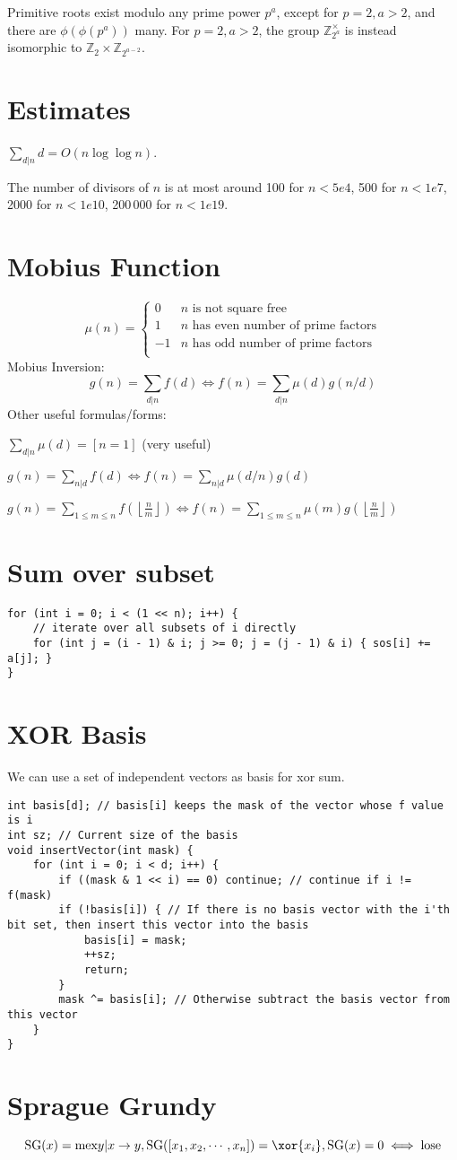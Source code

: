 	Primitive roots exist modulo any prime power $p^a$, except for $p = 2, a > 2$, and there are $\phi(\phi(p^a))$ many.
	For $p = 2, a > 2$, the group $\mathbb Z_{2^a}^\times$ is instead isomorphic to $\mathbb Z_2 \times \mathbb Z_{2^{a-2}}$.

\section{Estimates}
	$\sum_{d|n} d = O(n \log \log n)$.

	The number of divisors of $n$ is at most around 100 for $n < 5e4$, 500 for $n < 1e7$, 2000 for $n < 1e10$, 200\,000 for $n < 1e19$.

	\section{Mobius Function}
	\[
		\mu(n) = \begin{cases} 0 & n \textrm{ is not square free}\\ 1 & n \textrm{ has even number of prime factors}\\ -1 & n \textrm{ has odd number of prime factors}\\\end{cases}
	\]
	  Mobius Inversion:
	  \[ g(n) = \sum_{d|n} f(d) \Leftrightarrow f(n) = \sum_{d|n} \mu(d)g(n/d) \]
	  Other useful formulas/forms:
	
	  $ \sum_{d | n} \mu(d) = [ n = 1] $ (very useful)
	
	  $ g(n) = \sum_{n|d} f(d) \Leftrightarrow f(n) = \sum_{n|d} \mu(d/n)g(d)$
	
	 $ g(n) = \sum_{1 \leq m \leq n} f(\left\lfloor\frac{n}{m}\right \rfloor ) \Leftrightarrow f(n) = \sum_{1\leq m\leq n} \mu(m)g(\left\lfloor\frac{n}{m}\right\rfloor)$
	
\section{Sum over subset}
\begin{lstlisting}
for (int i = 0; i < (1 << n); i++) {
	// iterate over all subsets of i directly
	for (int j = (i - 1) & i; j >= 0; j = (j - 1) & i) { sos[i] += a[j]; }
}
\end{lstlisting}
\section{XOR Basis}
We can use a set of independent vectors as basis for xor sum.
\begin{lstlisting}
int basis[d]; // basis[i] keeps the mask of the vector whose f value is i
int sz; // Current size of the basis
void insertVector(int mask) {
	for (int i = 0; i < d; i++) {
		if ((mask & 1 << i) == 0) continue; // continue if i != f(mask)
		if (!basis[i]) { // If there is no basis vector with the i'th bit set, then insert this vector into the basis
			basis[i] = mask;
			++sz;
			return;
		}
		mask ^= basis[i]; // Otherwise subtract the basis vector from this vector
	}
}
\end{lstlisting}
\section{Sprague Grundy}
\[
	\textrm{SG}(x) = \textrm{mex}{y|x\to y}, \textrm{SG}([x_1, x_2, \cdots, x_n]) = \xor\{x_i\},\textrm{SG}(x)=0 \iff \textrm{lose}
\]
	   

